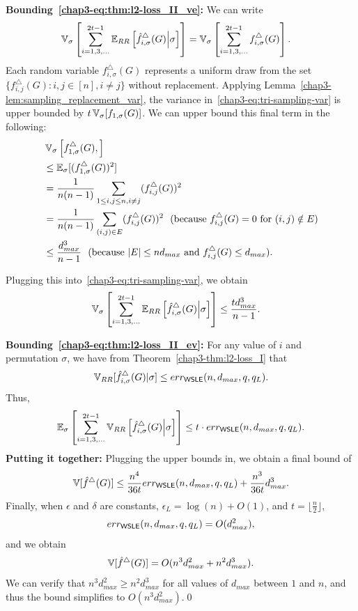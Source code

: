 \noindent\textbf{Bounding~\eqref{chap3-eq:thm:l2-loss_II_ve}:}
We can write
\begin{align}
  \operatorname{\mathbb{V}}_\sigma\left[\sum_{i = 1, 3, \ldots}^{2t-1} \operatorname{\mathbb{E}}_{RR}\left[\hat{f}_{i,\sigma}^\triangle(G)\middle|\sigma \right]\right]
    &= \operatorname{\mathbb{V}}_\sigma\left[\sum_{i = 1, 3, \ldots}^{2t-1}
    f_{i,\sigma}^\triangle(G)\right]. \label{chap3-eq:tri-sampling-var}
\end{align}
Each random variable $f_{i,\sigma}^\triangle(G)$ represents a uniform draw from the set
$\{f_{i,j}^\triangle(G) : i,j \in [n], i \neq j\}$ without replacement. Applying
Lemma~\ref{chap3-lem:sampling_replacement_var}, the variance
in~\eqref{chap3-eq:tri-sampling-var} is upper bounded by
$t \operatorname{\mathbb{V}}_\sigma[f_{1,\sigma}(G)]$. We can upper bound this final term
in the following:
\begin{align}
&\operatorname{\mathbb{V}}_\sigma\left[f_{1,\sigma}^\triangle(G), \right] \nonumber\\
&\leq \operatorname{\mathbb{E}}_\sigma[(f_{1,\sigma}^\triangle(G))^2] \nonumber\\
&= \frac{1}{n(n-1)} \sum_{1 \leq i, j \leq n, i \neq j} (f_{i,j}^\triangle(G))^2
\nonumber\\
&= \frac{1}{n(n-1)} \sum_{(i,j) \in E} (f_{i,j}^\triangle(G))^2 ~~ \text{(because $f_{i,j}^\triangle(G) = 0$ for $(i,j) \notin E$)} \nonumber\\
&\leq \frac{d_{max}^3}{n-1} ~~ \text{(because $|E| \leq n d_{max}$ and $f_{i,j}^\triangle(G) \leq d_{max}$)}.
\label{chap3-eq:thm:DP_II_cov_sigma_eq}
\end{align}

Plugging this into~\eqref{chap3-eq:tri-sampling-var}, we obtain
\begin{align*}
  \operatorname{\mathbb{V}}_\sigma\left[\sum_{i = 1, 3, \ldots}^{2t-1}
    \operatorname{\mathbb{E}}_{RR}\left[\hat{f}_{i,\sigma}^\triangle(G)\middle|\sigma \right]\right]
    &\leq \frac{td_{max}^3}{n-1}.
\end{align*}

\noindent\textbf{Bounding~\eqref{chap3-eq:thm:l2-loss_II_ev}:}
For any value of $i$ and permutation $\sigma$, we have
from Theorem~\ref{chap3-thm:l2-loss_I} that
\[
  \operatorname{\mathbb{V}}_{RR}[\hat{f}_{i,\sigma}^\triangle(G)|\sigma] \leq
  err_{\textsf{WSLE}{}}(n,d_{max}, q, q_L).
\]
Thus,
\[
  \operatorname{\mathbb{E}}_\sigma\left[\sum_{i = 1, 3, \ldots}^{2t-1}
    \operatorname{\mathbb{V}}_{RR}\left[\hat{f}_{i,\sigma}^\triangle(G)\middle|\sigma \right]\right]
    \leq t \cdot err_{\textsf{WSLE}{}}(n,d_{max}, q, q_L).
\]
\noindent\textbf{Putting it together:}
Plugging the upper bounds in, we obtain a
final bound of
\[
  \V[\hf^\triangle(G)] \leq
  \frac{n^4}{36t}err_{\AlgWSLE{}}(n,d_{max},q,q_L) +
  \frac{n^3}{36t}d_{max}^3. %
\]
Finally, when $\epsilon$ and $\delta$ are constants, $\epsilon_L = \log(n) + O(1)$, and $t = \lfloor\frac{n}{2}\rfloor$,
\[err_{\textsf{WSLE}{}}(n,d_{max},q,q_L) = O(d_{max}^2),\] and we obtain
\[
  \operatorname{\mathbb{V}}[\hat{f}^\triangle(G)] = O(n^3d_{max}^2 + n^2d_{max}^3).
\]
We can verify that $n^3d_{max}^2 \geq n^2d_{max}^3$ for all values of $d_{max}$
between $1$ and $n$, and thus the bound simplifies to $O(n^3 d_{max}^2)$.\qed

